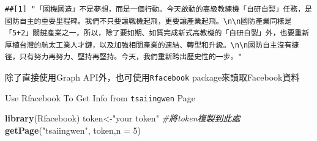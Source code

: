 \documentclass[]{book}
\newenvironment{Shaded}{\begin{snugshade}}{\end{snugshade}}
\newcommand{\KeywordTok}[1]{\textcolor[rgb]{0.13,0.29,0.53}{\textbf{{#1}}}}
\newcommand{\DataTypeTok}[1]{\textcolor[rgb]{0.13,0.29,0.53}{{#1}}}
\newcommand{\DecValTok}[1]{\textcolor[rgb]{0.00,0.00,0.81}{{#1}}}
\newcommand{\StringTok}[1]{\textcolor[rgb]{0.31,0.60,0.02}{{#1}}}
\newcommand{\CommentTok}[1]{\textcolor[rgb]{0.56,0.35,0.01}{\textit{{#1}}}}
\newcommand{\NormalTok}[1]{{#1}}
\theoremstyle{definition}
\theoremstyle{definition}
\theoremstyle{remark}
\begin{document}
\begin{Shaded}
\end{Shaded}

\begin{verbatim}
##[1] "「國機國造」不是夢想，而是一個行動。今天啟動的高級教練機「自研自製」任務，是國防自主的重要里程碑。我們不只要讓戰機起飛，更要讓產業起飛。\n\n國防產業同樣是「5+2」關鍵產業之一，所以，除了要如期、如質完成新式高教機的「自研自製」外，也要重新厚植台灣的航太工業人才鏈，以及加強相關產業的連結、轉型和升級。\n\n國防自主沒有捷徑，只有努力再努力、堅持再堅持。今天，我們重新跨出歷史性的一步。"
\end{verbatim}

除了直接使用Graph API外，也可使用\texttt{Rfacebook} \citep{R-Rfacebook}
package來讀取Facebook資料

Use Rfacebook To Get Info from \texttt{tsaiingwen} Page

\begin{Shaded}
\begin{Highlighting}[]
\KeywordTok{library}\NormalTok{(Rfacebook)}
\NormalTok{token<-}\StringTok{"your token"} \CommentTok{#將token複製到此處 }
\KeywordTok{getPage}\NormalTok{(}\StringTok{"tsaiingwen"}\NormalTok{, token,}\DataTypeTok{n =} \DecValTok{5}\NormalTok{)}
\end{Highlighting}
\end{Shaded}
\end{document}
